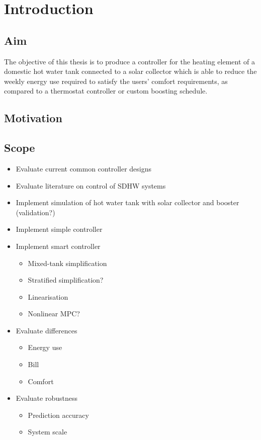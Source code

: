 \chapter{Introduction}

\section{Aim}

The objective of this thesis is to produce a controller for the heating element of a domestic hot water tank connected to a solar collector which is able to reduce the weekly energy use required to satisfy the users' comfort requirements, as compared to a thermostat controller or custom boosting schedule.

\section{Motivation}

\section{Scope}

\begin{itemize}
	\item Evaluate current common controller designs
	\item Evaluate literature on control of SDHW systems
	\item Implement simulation of hot water tank with solar collector and booster (validation?)
	\item Implement simple controller
	\item Implement smart controller
	\begin{itemize}
		\item Mixed-tank simplification
		\item Stratified simplification?
		\item Linearisation
		\item Nonlinear MPC?
	\end{itemize}
	\item Evaluate differences
	\begin{itemize}
		\item Energy use
		\item Bill
		\item Comfort
	\end{itemize}
	\item Evaluate robustness
	\begin{itemize}
		\item Prediction accuracy
		\item System scale
	\end{itemize}
\end{itemize}

